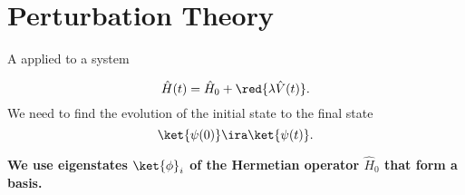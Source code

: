\section{Perturbation Theory}
\begin{framed}\noindent
  A  applied to a system

  \begin{equation}
    \label{eqn:pertHamiltonian}
    \hat{H}(t) = \hat{H}_0+\red{\lambda\hat{V}(t)}.
  \end{equation}
  \noindent We  need to find the  evolution of the initial  state to the
  final state
  \begin{equation}
    \ket{\psi(0)} \ira \ket{\psi(t)}.
  \end{equation}

  \noindent  \textbf{We use  eigenstates  $\ket{\phi}_i$  of the  Hermetian
    operator $\hat{H}_0$ that form a basis.}

\end{framed}

